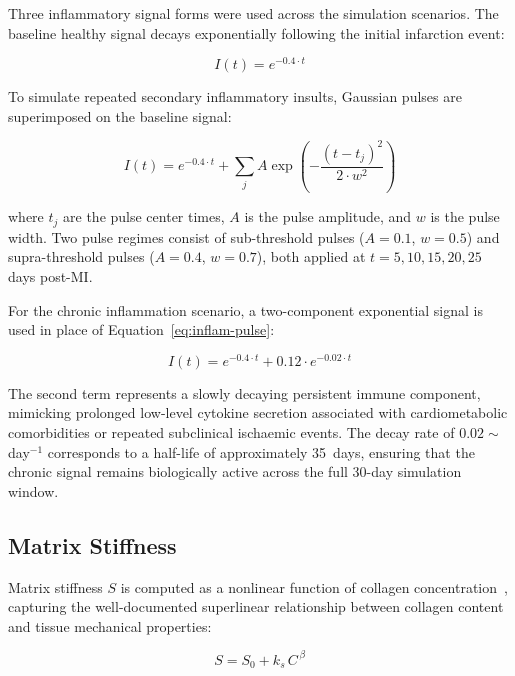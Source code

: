 \documentclass[Afour,sageh,times]{sagej}
\begin{document}
Three inflammatory signal forms were used across the simulation scenarios. The baseline healthy signal decays exponentially following the initial infarction event:

\begin{equation}\label{eq:inflam-healthy}
I(t) = e^{-0.4\cdot t}
\end{equation}

To simulate repeated secondary inflammatory insults, Gaussian pulses are superimposed on the baseline signal:

\begin{equation}\label{eq:inflam-pulse}
I(t) = e^{-0.4\cdot t} + \sum_{j} A \exp\!\left(-\frac{(t - t_j)^2}{2\cdot w^2}\right)
\end{equation}

where $t_j$ are the pulse center times, $A$ is the pulse amplitude, and $w$ is the pulse width. Two pulse regimes consist of sub-threshold pulses ($A=0.1$, $w=0.5$) and supra-threshold pulses ($A=0.4$, $w=0.7$), both applied at $t=5,10,15,20,25$ days post-MI.

For the chronic inflammation scenario, a two-component exponential signal is used in place of Equation~\ref{eq:inflam-pulse}:

\begin{equation}\label{eq:chron-inflam}
I(t) = e^{-0.4\cdot t} + 0.12 \cdot e^{-0.02\cdot t}
\end{equation}

The second term represents a slowly decaying persistent immune component, mimicking prolonged low-level cytokine secretion associated with cardiometabolic comorbidities or repeated subclinical ischaemic events. The decay rate of 
$0.02\sim$day$^{-1}$ corresponds to a half-life of approximately 35~days, ensuring that the chronic signal remains biologically active across the full 30-day simulation window.


\subsection{Matrix Stiffness}

Matrix stiffness $S$ is computed as a nonlinear function of collagen concentration~\citep{gachon2020stretching}, capturing the well-documented superlinear relationship between collagen content and tissue mechanical properties:

\begin{equation}\label{eq:stiffness}
S = S_0 + k_s\, C^{\,\beta}
\end{equation}
\end{document}
